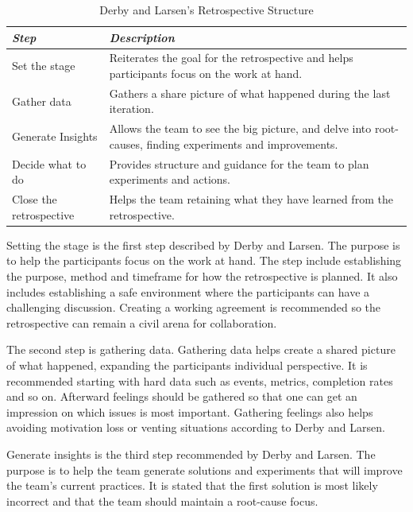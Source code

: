 \begin{table}[h]
	\begin{center}
		\caption{Derby and Larsen's Retrospective Structure}
		\label{table:retrospective-structure}
		\begin{tabular}{p{} p{}}
			\hline
			\textit{Step} & \textit{Description} \\
			\hline
			Set the stage & Reiterates the goal for the retrospective and helps participants focus on the work at hand. \\
			Gather data & Gathers a share picture of what happened during the last iteration. \\
			Generate Insights & Allows the team to see the big picture, and delve into root-causes, finding experiments and improvements. \\
			Decide what to do &  Provides structure and guidance for the team to plan experiments and actions. \\
			Close the retrospective & Helps the team retaining what they have learned from the retrospective. \\
			\hline
		\end{tabular}
	\end{center}
\end{table}

Setting the stage is the first step described by Derby and Larsen. The purpose is to help the participants focus on the work at hand. The step include establishing the purpose, method and timeframe for how the retrospective is planned. It also includes establishing a safe environment where the participants can have a challenging discussion. Creating a working agreement is recommended so the retrospective can remain a civil arena for collaboration. 

The second step is gathering data. Gathering data helps create a shared picture of what happened, expanding the participants individual perspective. It is recommended starting with hard data such as events, metrics, completion rates and so on. Afterward feelings should be gathered so that one can get an impression on which issues is most important. Gathering feelings also helps avoiding motivation loss or venting situations according to Derby and Larsen.

Generate insights is the third step recommended by Derby and Larsen. The purpose is to help the team generate solutions and experiments that will improve the team's current practices. It is stated that the first solution is most likely incorrect and that the team should maintain a root-cause focus. 

